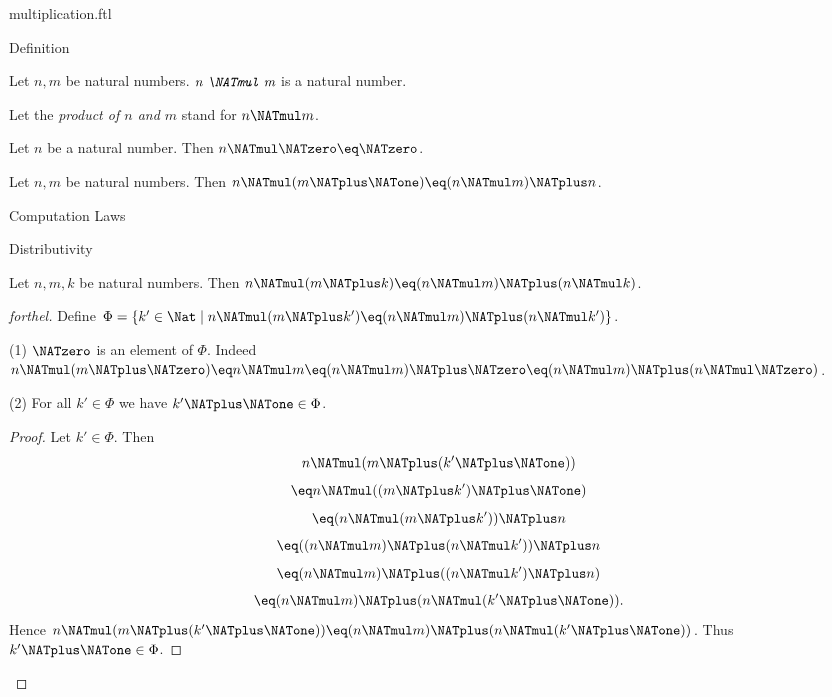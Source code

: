\documentclass{naproche-library}
\begin{document}
\begin{smodule}[title=Multiplication]{multiplication.ftl}

\begin{sfragment}{Definition}
  \begin{signature}[forthel,id=ARITHMETIC_06_6626346484629504]
    Let $n, m$ be natural numbers.
    $\emph{n \NATmul m}$ is a natural number.

    Let the \emph{product of $n$ and $m$} stand for $n \NATmul m$.
  \end{signature}

  \begin{axiom}[forthel,id=ARITHMETIC_06_8941041092657152]
    Let $n$ be a natural number.
    Then $n \NATmul \NATzero \eq \NATzero$.
  \end{axiom}

  \begin{axiom}[forthel,id=ARITHMETIC_06_2211275408932864]
    Let $n, m$ be natural numbers.
    Then $n \NATmul (m \NATplus \NATone) \eq (n \NATmul m) \NATplus n$.
  \end{axiom}
\end{sfragment}

\begin{sfragment}{Computation Laws}
  \begin{sfragment}{Distributivity}
    \begin{proposition}[forthel,id=ARITHMETIC_06_9001524774567936]
      Let $n, m, k$ be natural numbers.
      Then $n \NATmul (m \NATplus k) \eq (n \NATmul m) \NATplus (n \NATmul k)$.
    \end{proposition}
    \begin{proof}[forthel]
      Define $\Phi = \{ k' \in \Nat \mid n \NATmul (m \NATplus k') \eq (n \NATmul m) \NATplus (n \NATmul k') \}$.

      (1) $\NATzero$ is an element of $\Phi$.
      Indeed $n \NATmul (m \NATplus \NATzero)
        \eq n \NATmul m
        \eq (n \NATmul m) \NATplus \NATzero
        \eq (n \NATmul m) \NATplus (n \NATmul \NATzero)$.

      (2) For all $k' \in \Phi$ we have $k' \NATplus \NATone \in \Phi$. 
      \begin{proof}
        Let $k'\in \Phi$.
        Then
        \[  n \NATmul (m \NATplus (k' \NATplus \NATone))                  \]
        \[    \eq n \NATmul ((m \NATplus k') \NATplus \NATone)              \]
        \[    \eq (n \NATmul (m \NATplus k')) \NATplus n              \]
        \[    \eq ((n \NATmul m) \NATplus (n \NATmul k')) \NATplus n    \]
        \[    \eq (n \NATmul m) \NATplus ((n \NATmul k') \NATplus n)    \]
        \[    \eq (n \NATmul m) \NATplus (n \NATmul (k' \NATplus \NATone)).   \]
        Hence $n \NATmul (m \NATplus (k' \NATplus \NATone)) \eq (n \NATmul m) \NATplus (n \NATmul (k' \NATplus \NATone))$.
        Thus $k' \NATplus \NATone \in \Phi$.
      \end{proof}


\end{proof}
\end{sfragment}
\end{sfragment}
\end{smodule}
\end{document}
